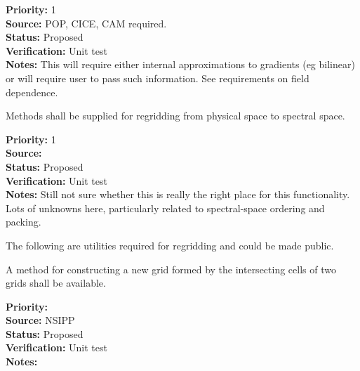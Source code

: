 \begin{reqlist}
{\bf Priority:} 1 \\
{\bf Source:}  POP, CICE, CAM required. \\
{\bf Status:} Proposed \\
{\bf Verification:} Unit test \\
{\bf Notes:} This will require either internal approximations to
             gradients (eg bilinear) or will require user
             to pass such information.  See requirements on field
             dependence.
\end{reqlist}


Methods shall be supplied for regridding from physical space to
spectral space.

\begin{reqlist}
{\bf Priority:} 1 \\
{\bf Source:}  \\
{\bf Status:} Proposed \\
{\bf Verification:} Unit test \\
{\bf Notes:} Still not sure whether this is really the right place
             for this functionality.
             Lots of unknowns here, particularly related to
             spectral-space ordering and packing.
\end{reqlist}


The following are utilities required for regridding and could be made
public.


A method for constructing a new grid formed by the intersecting
cells of two grids shall be available.

\begin{reqlist}
{\bf Priority:}  \\
{\bf Source:}  NSIPP \\
{\bf Status:} Proposed \\
{\bf Verification:} Unit test \\
{\bf Notes:} 
\end{reqlist}

